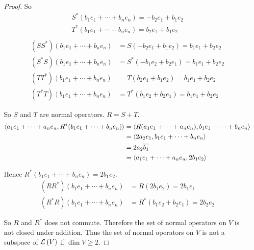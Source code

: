 \begin{proof}
    So
    \[
        \begin{split}
            S^{*}(b_{1}e_{1} + \cdots + b_{n}e_{n}) = -b_{2}e_{1} + b_{1}e_{2} \\
            T^{*}(b_{1}e_{1} + \cdots + b_{n}e_{n}) = b_{2}e_{1} + b_{1}e_{2}  \\
        \end{split}
    \]
    \begin{align*}
        (SS^{*})(b_{1}e_{1} + \cdots + b_{n}e_{n}) & = S(-b_{2}e_{1} + b_{1}e_{2}) = b_{1}e_{1} + b_{2}e_{2}     \\
        (S^{*}S)(b_{1}e_{1} + \cdots + b_{n}e_{n}) & = S^{*}(-b_{1}e_{2} + b_{2}e_{1}) = b_{1}e_{1} + b_{2}e_{2} \\
        (TT^{*})(b_{1}e_{1} + \cdots + b_{n}e_{n}) & = T(b_{2}e_{1} + b_{1}e_{2}) = b_{1}e_{1} + b_{2}e_{2}      \\
        (T^{*}T)(b_{1}e_{1} + \cdots + b_{n}e_{n}) & = T^{*}(b_{1}e_{2} + b_{2}e_{1}) = b_{1}e_{1} + b_{2}e_{2}
    \end{align*}

    So $S$ and $T$ are normal operators. $R = S + T$.
    \begin{align*}
        \left\langle{a_{1}e_{1} + \cdots + a_{n}e_{n}, R^{*}(b_{1}e_{1} + \cdots + b_{n}e_{n})}\right\rangle & = \left\langle{R(a_{1}e_{1} + \cdots + a_{n}e_{n}), b_{1}e_{1} + \cdots + b_{n}e_{n}}\right\rangle \\
                                                                                              & = \left\langle{2a_{2}e_{1}, b_{1}e_{1} + \cdots + b_{n}e_{n}}\right\rangle                         \\
                                                                                              & = 2a_{2}\overline{b_{1}}                                                                \\
                                                                                              & = \left\langle{a_{1}e_{1} + \cdots + a_{n}e_{n}, 2b_{1}e_{2}}\right\rangle
    \end{align*}

    Hence $R^{*}(b_{1}e_{1} + \cdots + b_{n}e_{n}) = 2b_{1}e_{2}$.
    \begin{align*}
        (RR^{*})(b_{1}e_{1} + \cdots + b_{n}e_{n}) & = R(2b_{1}e_{2}) = 2b_{1}e_{1}                 \\
        (R^{*}R)(b_{1}e_{1} + \cdots + b_{n}e_{n}) & = R^{*}(b_{1}e_{2} + b_{2}e_{1}) = 2b_{2}e_{2}
    \end{align*}

    So $R$ and $R^{*}$ does not commute. Therefore the set of normal operators on $V$ is not closed under addition. Thus the set of normal operators on $V$ is not a subspace of $\mathcal{L}\left({V}\right)$ if $\dim V\geq 2$.
\end{proof}
\newpage

